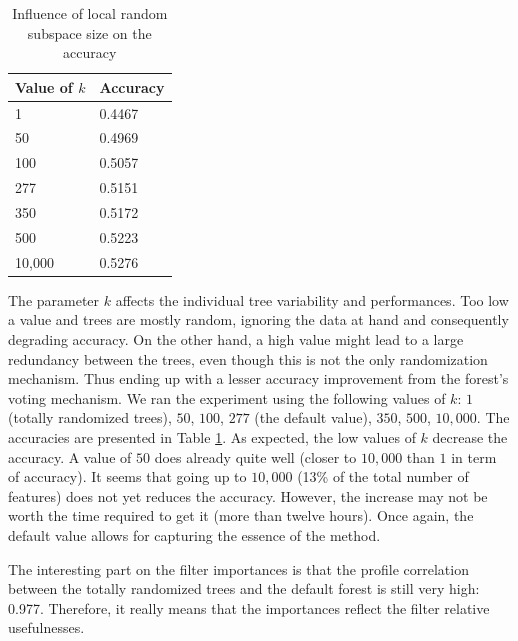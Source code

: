 \documentclass[a4paper]{report}
\newlength{\larg}
\begin{document}
		\begin{table}
			\centering
				\begin{tabular}{l|l}
				\hline
				Value of $k$ & Accuracy\\
				\hline \hline
				1 &  0.4467 \\
				50 & 0.4969 \\
				100 & 0.5057 \\
				277 & 0.5151 \\
				350 & 0.5172 \\
				500 & 0.5223 \\
				10,000 & 0.5276 \\
				\hline
				\end{tabular}
			\caption{\label{tab:AccFK}Influence of local random subspace size on the accuracy}
		\end{table}
		
		The parameter $k$ affects the individual tree variability and performances. Too low a value and trees are mostly random, ignoring the data at hand and consequently degrading accuracy. On the other hand, a high value might lead to a large redundancy between the trees, even though this is not the only randomization mechanism. Thus ending up with a lesser accuracy improvement from the forest's voting mechanism. 
		We ran the experiment using the following values of $k$: $1$ (totally randomized trees), $50$, $100$, $277$ (the default value), $350$, $500$, $10,000$. The accuracies are presented in Table \ref{tab:AccFK}. 
		As expected, the low values of $k$ decrease the accuracy. A value of $50$ does already quite well (closer to $10,000$ than $1$ in term of accuracy). It seems that going up to $10,000$ (13\% of the total number of features) does not yet reduces the accuracy. However, the increase may not be worth the time required to get it (more than twelve hours). Once again, the default value allows for capturing the essence of the method.
		\par
		The interesting part on the filter importances is that the profile correlation between the totally randomized trees and the default forest is still very high: 0.977. Therefore, it really means that the importances reflect the  filter relative usefulnesses.
		
		
		
		
		
		
		
\end{document}
